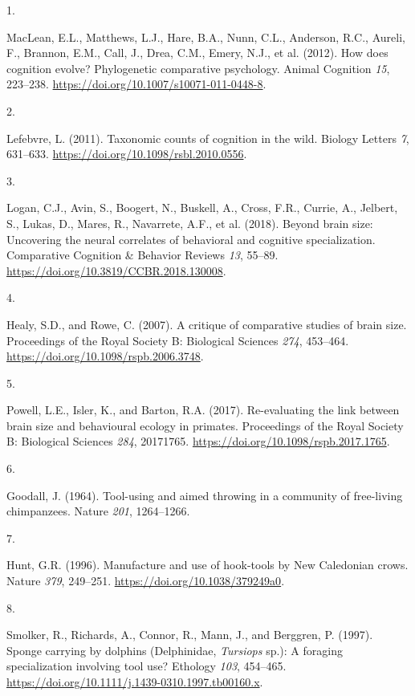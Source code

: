 \documentclass[
  man, donotrepeattitle,floatsintext]{apa6}
\newlength{\cslhangindent}
\newlength{\csllabelwidth}
\newlength{\cslentryspacingunit} %
\newenvironment{CSLReferences}[2] %
 {%
  \setlength{\parindent}{0pt}
  \ifodd #1
  \let\oldpar\par
  \def\par{\hangindent=\cslhangindent\oldpar}
  \fi
  \setlength{\parskip}{#2\cslentryspacingunit}
 }%
 {}
\newcommand{\CSLLeftMargin}[1]{\parbox[t]{\csllabelwidth}{#1}}
\newcommand{\CSLRightInline}[1]{\parbox[t]{\linewidth - \csllabelwidth}{#1}\break}
\begin{document}
\hypertarget{refs}{}
\begin{CSLReferences}{0}{0}
\leavevmode{}%
\CSLLeftMargin{1. }%
\CSLRightInline{MacLean, E.L., Matthews, L.J., Hare, B.A., Nunn, C.L., Anderson, R.C., Aureli, F., Brannon, E.M., Call, J., Drea, C.M., Emery, N.J., et al. (2012). How does cognition evolve? Phylogenetic comparative psychology. Animal Cognition \emph{15}, 223--238. \url{https://doi.org/10.1007/s10071-011-0448-8}.}

\leavevmode{}%
\CSLLeftMargin{2. }%
\CSLRightInline{Lefebvre, L. (2011). Taxonomic counts of cognition in the wild. Biology Letters \emph{7}, 631--633. \url{https://doi.org/10.1098/rsbl.2010.0556}.}

\leavevmode{}%
\CSLLeftMargin{3. }%
\CSLRightInline{Logan, C.J., Avin, S., Boogert, N., Buskell, A., Cross, F.R., Currie, A., Jelbert, S., Lukas, D., Mares, R., Navarrete, A.F., et al. (2018). Beyond brain size: Uncovering the neural correlates of behavioral and cognitive specialization. Comparative Cognition \& Behavior Reviews \emph{13}, 55--89. \url{https://doi.org/10.3819/CCBR.2018.130008}.}

\leavevmode{}%
\CSLLeftMargin{4. }%
\CSLRightInline{Healy, S.D., and Rowe, C. (2007). A critique of comparative studies of brain size. Proceedings of the Royal Society B: Biological Sciences \emph{274}, 453--464. \url{https://doi.org/10.1098/rspb.2006.3748}.}

\leavevmode{}%
\CSLLeftMargin{5. }%
\CSLRightInline{Powell, L.E., Isler, K., and Barton, R.A. (2017). Re-evaluating the link between brain size and behavioural ecology in primates. Proceedings of the Royal Society B: Biological Sciences \emph{284}, 20171765. \url{https://doi.org/10.1098/rspb.2017.1765}.}

\leavevmode{}%
\CSLLeftMargin{6. }%
\CSLRightInline{Goodall, J. (1964). Tool-using and aimed throwing in a community of free-living chimpanzees. Nature \emph{201}, 1264--1266.}

\leavevmode{}%
\CSLLeftMargin{7. }%
\CSLRightInline{Hunt, G.R. (1996). Manufacture and use of hook-tools by {N}ew {C}aledonian crows. Nature \emph{379}, 249--251. \url{https://doi.org/10.1038/379249a0}.}

\leavevmode{}%
\CSLLeftMargin{8. }%
\CSLRightInline{Smolker, R., Richards, A., Connor, R., Mann, J., and Berggren, P. (1997). Sponge carrying by dolphins ({D}elphinidae, \emph{{T}ursiops} sp.): A foraging specialization involving tool use? Ethology \emph{103}, 454--465. \url{https://doi.org/10.1111/j.1439-0310.1997.tb00160.x}.}


\end{CSLReferences}
\end{document}

